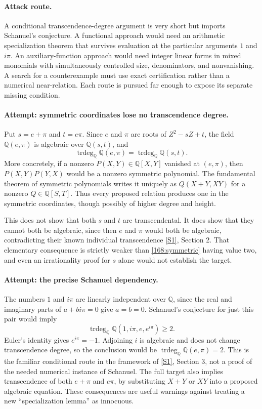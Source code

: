 \documentclass[11pt,a4paper]{article}
\newcommand{\Q}{\mathbb{Q}}
\newcommand{\sref}[2]{\hyperlink{source:#1:#2}{[S#2]}}
\numberwithin{equation}{section}
\begin{document}
\paragraph{Attack route.}
A conditional transcendence-degree argument is very short but imports
Schanuel's conjecture. A functional approach would need an arithmetic
specialization theorem that survives evaluation at the particular
arguments $1$ and $i\pi$. An auxiliary-function approach would need
integer linear forms in mixed monomials with simultaneously controlled
size, denominators, and nonvanishing. A search for a counterexample must
use exact certification rather than a numerical near-relation. Each
route is pursued far enough to expose its separate missing condition.

\paragraph{Attempt: symmetric coordinates lose no transcendence degree.}
Put $s=e+\pi$ and $t=e\pi$. Since $e$ and $\pi$ are roots of
$Z^2-sZ+t$, the field $\Q(e,\pi)$ is algebraic over $\Q(s,t)$, and
\begin{equation}\label{168:symmetric}
 \operatorname{trdeg}_{\Q}\Q(e,\pi)
 =\operatorname{trdeg}_{\Q}\Q(s,t).
\end{equation}
More concretely, if a nonzero $P(X,Y)\in\Q[X,Y]$ vanished at $(e,\pi)$,
then $P(X,Y)P(Y,X)$ would be a nonzero symmetric polynomial. The
fundamental theorem of symmetric polynomials writes it uniquely as
$Q(X+Y,XY)$ for a nonzero $Q\in\Q[S,T]$. Thus every proposed relation
produces one in the symmetric coordinates, though possibly of higher
degree and height.

This does not show that both $s$ and $t$ are transcendental. It does
show that they cannot both be algebraic, since then $e$ and $\pi$ would
both be algebraic, contradicting their known individual transcendence
\sref{168}{1}, Section 2. That elementary consequence is strictly weaker
than \eqref{168:symmetric} having value two, and even an irrationality
proof for $s$ alone would not establish the target.

\paragraph{Attempt: the precise Schanuel dependency.}
The numbers $1$ and $i\pi$ are linearly independent over $\Q$, since
the real and imaginary parts of $a+bi\pi=0$ give $a=b=0$. Schanuel's
conjecture for just this pair would imply
\begin{equation}
 \operatorname{trdeg}_{\Q}\Q(1,i\pi,e,e^{i\pi})\geq2.
\end{equation}
Euler's identity gives $e^{i\pi}=-1$. Adjoining $i$ is algebraic and
does not change transcendence degree, so the conclusion would be
$\operatorname{trdeg}_{\Q}\Q(e,\pi)=2$. This is the familiar conditional
route in the framework of \sref{168}{1}, Section 3, not a proof of the
needed numerical instance of Schanuel. The full target also implies
transcendence of both $e+\pi$ and $e\pi$, by substituting $X+Y$ or $XY$
into a proposed algebraic equation. These consequences are useful
warnings against treating a new ``specialization lemma'' as innocuous.
\end{document}
